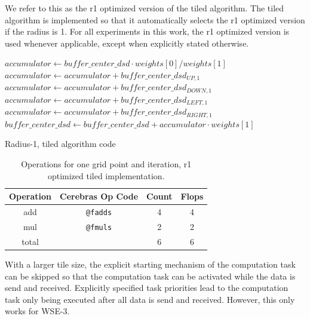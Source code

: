 We refer to this as the r1 optimized version of the tiled algorithm.
The tiled algorithm is implemented so that it automatically selects the r1 optimized version if the radius is 1.
For all experiments in this work, the r1 optimized version is used whenever applicable, except when explicitly stated otherwise.

\begin{algorithm}[tbh]
    \SetAlgoLined
    $accumulator \gets buffer\_center\_dsd \cdot weights[0]/weights[1]$\;
    $accumulator \gets accumulator + buffer\_center\_dsd_{UP,1}$\;
    $accumulator \gets accumulator + buffer\_center\_dsd_{DOWN,1}$\;
    $accumulator \gets accumulator + buffer\_center\_dsd_{LEFT,1}$\;
    $accumulator \gets accumulator + buffer\_center\_dsd_{RIGHT,1}$\;
    $buffer\_center\_dsd \gets buffer\_center\_dsd + accumulator \cdot weights[1]$\;
    \caption{Radius-1, tiled algorithm code}\label{alg:r1_tiled_algorithm}
\end{algorithm}

\begin{table}[h]
    \centering
    \caption{Operations for one grid point and iteration, r1 optimized tiled implementation.}
    \label{tab:tiled_operations_r1_optimized}
    \begin{tabular}{@{}cccc@{}}
        \toprule
        Operation & Cerebras Op Code & Count & Flops \\
        \midrule
        add & \texttt{@fadds} & \num{4} & \num{4} \\
        mul & \texttt{@fmuls} & \num{2} & \num{2} \\
        \midrule
        total & & \num{6} & \num{6} \\
        \bottomrule
    \end{tabular}
\end{table}

With a larger tile size, the explicit starting mechanism of the computation task can be skipped so that the computation task can be activated while the data is send and received. Explicitly specified task priorities lead to the computation task only being executed after all data is send and received. However, this only works for WSE-3. 